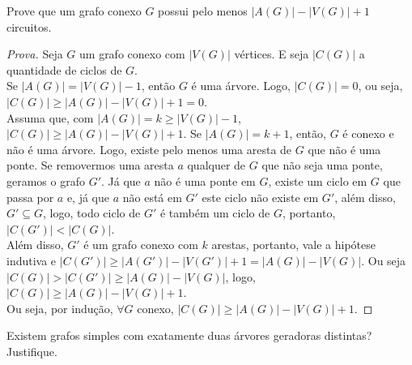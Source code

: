\documentclass[12pt]{article}
\newenvironment{problem}[2][Ex]{\begin{trivlist}
\item[\hskip \labelsep {\bfseries #1}\hskip \labelsep {\bfseries #2.}]}{\end{trivlist}}
\begin{document}
\begin{problem}{12}
Prove que um grafo conexo $G$ possui pelo menos $|A(G)| - |V(G)| + 1$ circuitos.
\end{problem}

\begin{proof}[Prova]
Seja $G$ um grafo conexo com $|V(G)|$ vértices. E seja $|C(G)|$ a quantidade de ciclos de $G$.\\
Se $|A(G)| = |V(G)| - 1$, então $G$ é uma árvore. Logo, $|C(G)| = 0$, ou seja, $|C(G)| \geq |A(G)| - |V(G)| + 1 = 0$. \\
Assuma que, com $|A(G)| = k \geq |V(G)| - 1$, $|C(G)| \geq |A(G)| - |V(G)| + 1$.
Se $|A(G)| = k + 1$, então, $G$ é conexo e não é uma árvore. Logo, existe pelo menos uma aresta de $G$ que não é uma ponte. Se removermos uma aresta $a$ qualquer de $G$ que não seja uma ponte, geramos o grafo $G'$. Já que $a$ não é uma ponte em $G$, existe um ciclo em $G$ que passa por $a$ e, já que $a$ não está em $G'$ este ciclo não existe em $G'$, além disso, $G' \subseteq G$, logo, todo ciclo de $G'$ é também um ciclo de $G$, portanto, $|C(G')| < |C(G)|$. \\
Além disso, $G'$ é um grafo conexo com $k$ arestas, portanto, vale a hipótese indutiva e $|C(G')| \geq |A(G')| - |V(G')| + 1 = |A(G)| - |V(G)|$. Ou seja $|C(G)| > |C(G')| \geq |A(G)| - |V(G)|$, logo, $|C(G)| \geq |A(G)| - |V(G)| + 1$. \\
Ou seja, por indução, $\forall G$ conexo, $|C(G)| \geq |A(G)| - |V(G)| + 1$.
\end{proof}

\begin{problem}{13}
Existem grafos simples com exatamente duas árvores geradoras distintas? Justifique.
\end{problem}
\end{document}
